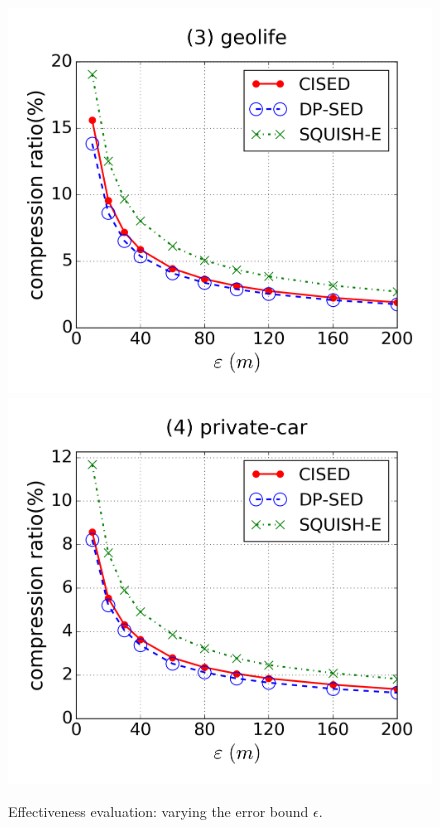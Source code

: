 \begin{figure}[tb!]
\includegraphics[scale = 0.25]{figures/Exp-cr-epsilon-geolife.png}
\includegraphics[scale = 0.25]{figures/Exp-cr-epsilon-private.png}
\vspace{-3ex}
\caption{\small Effectiveness evaluation: varying the error bound $\epsilon$.}
\label{fig:cr}
\vspace{-1.0ex}
\end{figure}

